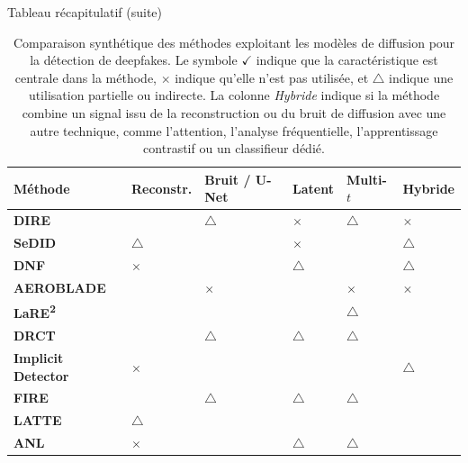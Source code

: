 \documentclass[10pt,aspectratio=169]{beamer}
\begin{document}
\begin{frame}{Tableau récapitulatif (suite)}
    \newcommand{\cmark}{\checkmark}
\newcommand{\xmark}{\(\times\)}
\newcommand{\pmark}{\(\triangle\)} %

\begin{table}[htbp]
\centering
\scriptsize
\renewcommand{\arraystretch}{1.15}
\begin{tabularx}{\textwidth}{
>{\raggedright\arraybackslash}p{2.8cm}
>{\centering\arraybackslash}p{1.4cm}
>{\centering\arraybackslash}p{1.7cm}
>{\centering\arraybackslash}p{1.3cm}
>{\centering\arraybackslash}p{1.4cm}
>{\centering\arraybackslash}p{1.4cm}
}
\toprule
\textbf{Méthode} 
& \textbf{Reconstr.} 
& \textbf{Bruit / U-Net} 
& \textbf{Latent} 
& \textbf{Multi-\(t\)}
& \textbf{Hybride} \\
\midrule

\textbf{DIRE} 
& \cmark 
& \pmark 
& \xmark 
& \pmark 
& \xmark \\

\textbf{SeDID} 
& \pmark 
& \cmark 
& \xmark 
& \cmark 
& \pmark \\

\textbf{DNF} 
& \xmark 
& \cmark 
& \pmark 
& \cmark 
& \pmark \\

\textbf{AEROBLADE} 
& \cmark 
& \xmark 
& \cmark 
& \xmark 
& \xmark \\

\textbf{LaRE\textsuperscript{2}} 
& \cmark 
& \cmark 
& \cmark 
& \pmark 
& \cmark \\

\textbf{DRCT} 
& \cmark 
& \pmark 
& \pmark 
& \pmark 
& \cmark \\

\textbf{Implicit Detector} 
& \xmark 
& \cmark 
& \cmark 
& \cmark 
& \pmark \\


\textbf{FIRE} 
& \cmark 
& \pmark 
& \pmark 
& \pmark 
& \cmark \\

\textbf{LATTE} 
& \pmark 
& \cmark 
& \cmark 
& \cmark 
& \cmark \\

\textbf{ANL} 
& \xmark 
& \cmark 
& \pmark 
& \pmark 
& \cmark \\

\bottomrule
\end{tabularx}
\caption{Comparaison synthétique des méthodes exploitant les modèles de diffusion pour la détection de deepfakes. Le symbole \(\checkmark\) indique que la caractéristique est centrale dans la méthode, \(\times\) indique qu’elle n’est pas utilisée, et \(\triangle\) indique une utilisation partielle ou indirecte. La colonne \textit{Hybride} indique si la méthode combine un signal issu de la reconstruction ou du bruit de diffusion avec une autre technique, comme l’attention, l’analyse fréquentielle, l’apprentissage contrastif ou un classifieur dédié.}
\label{tab:comparison_diffusion_detection_methods}
\end{table}
\end{frame}
\end{document}
